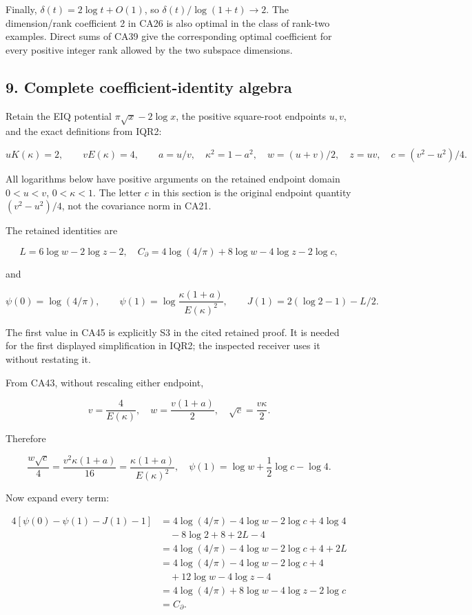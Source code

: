 Finally, \(\delta(t)=2\log t+O(1)\), so \(\delta(t)/\log(1+t)\to2\). The dimension/rank coefficient 2 in CA26 is also optimal in the class of rank-two examples. Direct sums of CA39 give the corresponding optimal coefficient for every positive integer rank allowed by the two subspace dimensions.

\subsection{9. Complete coefficient-identity algebra}\label{complete-coefficient-identity-algebra}

Retain the EIQ potential \(\pi\sqrt x-2\log x\), the positive square-root endpoints \(u,v\), and the exact definitions from IQR2:

\[
uK(\kappa)=2,\qquad vE(\kappa)=4,\qquad
a=u/v,\quad \kappa^2=1-a^2,
\quad w=(u+v)/2,\quad z=uv,\quad c=(v^2-u^2)/4.
\tag{CA43}
\]

All logarithms below have positive arguments on the retained endpoint domain \(0<u<v\), \(0<\kappa<1\). The letter \(c\) in this section is the original endpoint quantity \((v^2-u^2)/4\), not the covariance norm in CA21.

The retained identities are

\[
L=6\log w-2\log z-2,
\quad C_\partial=4\log(4/\pi)+8\log w-4\log z-2\log c,
\tag{CA44}
\]

and

\[
\psi(0)=\log(4/\pi),\qquad
\psi(1)=\log\frac{\kappa(1+a)}{E(\kappa)^2},
\qquad J(1)=2(\log2-1)-L/2.
\tag{CA45}
\]

The first value in CA45 is explicitly S3 in the cited retained proof. It is needed for the first displayed simplification in IQR2; the inspected receiver uses it without restating it.

From CA43, without rescaling either endpoint,

\[
v=\frac4{E(\kappa)},\quad
w=\frac{v(1+a)}2,\quad
\sqrt c=\frac{v\kappa}2.
\]

Therefore

\[
\frac{w\sqrt c}{4}
=\frac{v^2\kappa(1+a)}{16}
=\frac{\kappa(1+a)}{E(\kappa)^2},
\quad
\psi(1)=\log w+\frac12\log c-\log4.
\tag{CA46}
\]

Now expand every term:

\[
\begin{aligned}
4[\psi(0)-\psi(1)-J(1)-1]
&=4\log(4/\pi)
-4\log w-2\log c+4\log4\\
&\quad-8\log2+8+2L-4\\
&=4\log(4/\pi)-4\log w-2\log c+4+2L\\
&=4\log(4/\pi)-4\log w-2\log c+4\\
&\quad+12\log w-4\log z-4\\
&=4\log(4/\pi)+8\log w-4\log z-2\log c\\
&=C_\partial.
\end{aligned}
\tag{CA47}
\]

